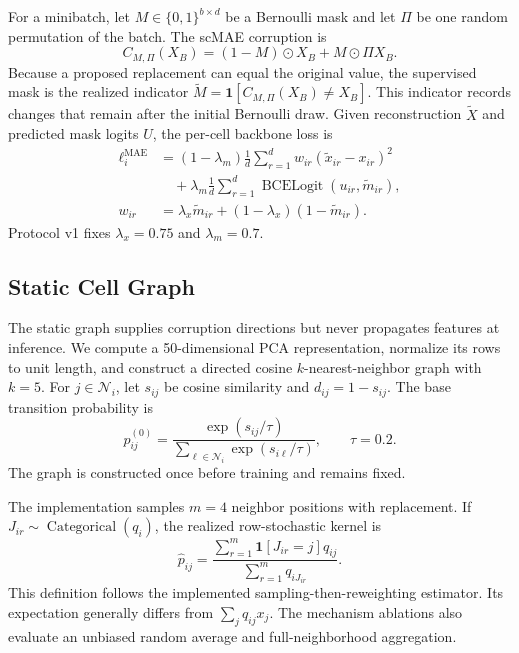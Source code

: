 For a minibatch, let $M\in\{0,1\}^{b\times d}$ be a Bernoulli mask and let
$\Pi$ be one random permutation of the batch.  The scMAE corruption is
\begin{equation}
 C_{M,\Pi}(X_B)=(1-M)\odot X_B+M\odot\Pi X_B .
 \label{eq:scmae-corruption}
\end{equation}
Because a proposed replacement can equal the original value, the supervised
mask is the realized indicator
$\widetilde M=\mathbf{1}[C_{M,\Pi}(X_B)\neq X_B]$. This indicator records
changes that remain after the initial Bernoulli draw. Given reconstruction $\widetilde X$ and predicted mask logits
$U$, the per-cell backbone loss is
\begin{align}
 \ell_i^{\mathrm{MAE}}
 &= (1-\lambda_m)\frac{1}{d}\sum_{r=1}^d
 w_{ir}(\widetilde x_{ir}-x_{ir})^2
 \nonumber\\
 &\quad+\lambda_m\frac{1}{d}\sum_{r=1}^d
 \operatorname{BCELogit}(u_{ir},\widetilde m_{ir}),
 \label{eq:backbone-loss}\\
 w_{ir}&=\lambda_x\widetilde m_{ir}+(1-\lambda_x)(1-\widetilde m_{ir}).
\end{align}
Protocol v1 fixes $\lambda_x=0.75$ and $\lambda_m=0.7$.

\subsection{Static Cell Graph}

The static graph supplies corruption directions but never propagates features
at inference. We compute a 50-dimensional PCA representation, normalize its rows to unit
length, and construct a directed cosine $k$-nearest-neighbor graph with $k=5$.
For $j\in\mathcal N_i$, let $s_{ij}$ be cosine similarity and
$d_{ij}=1-s_{ij}$.  The base transition probability is
\begin{equation}
 p_{ij}^{(0)}=
 \frac{\exp(s_{ij}/\tau)}{\sum_{\ell\in\mathcal N_i}\exp(s_{i\ell}/\tau)},
 \qquad \tau=0.2.
 \label{eq:base-kernel}
\end{equation}
The graph is constructed once before training and remains fixed.

The implementation samples $m=4$ neighbor positions with replacement.  If
$J_{ir}\sim\operatorname{Categorical}(q_i)$, the realized row-stochastic kernel
is
\begin{equation}
 \widehat p_{ij}=
 \frac{\sum_{r=1}^{m}\mathbf{1}[J_{ir}=j]q_{ij}}
 {\sum_{r=1}^{m}q_{iJ_{ir}}}.
 \label{eq:realized-kernel}
\end{equation}
This definition follows the implemented sampling-then-reweighting estimator.
Its expectation generally differs from $\sum_jq_{ij}x_j$. The mechanism
ablations also evaluate an unbiased random average and full-neighborhood
aggregation.

